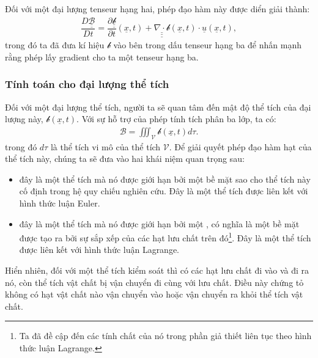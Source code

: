 \documentclass[../../../main.tex]{subfiles}
\begin{document}
		Đối với một đại lượng tenseur hạng hai, phép đạo hàm này được diển giải thành:
			\begin{align}
				\boxed{\dfrac{D\underline{\underline{\mathscr{B}}}}{Dt}=\dfrac{\partial\underline{\underline{\mathscr{b}}}}{\partial t}\left(\underline{x},t\right)+\underline{\underline{\underline{\nabla\cdot\mathscr{b}}}}\left(\underline{x},t\right)\cdot\underline{u}\left(\underline{x},t\right)},
			\end{align}
		trong đó ta đã đưa kí hiệu $\mathscr{b}$ vào bên trong dấu tenseur  hạng ba để nhấn mạnh rằng phép lấy gradient cho ta một tenseur hạng ba.
	\subsubsection{Tính toán cho đại lượng thể tích}
		Đối với một đại lượng thể tích, người ta sẽ quan tâm đến mật độ thể tích của đại lượng này, $\mathcal{b}\left(\underline{x},t\right)$. Với sự hỗ trợ của phép tính tích phân ba lớp, ta có:
			\begin{align}\label{eq:Quantite_Volumique_def}
				\mathscr{B}=\iiint_{\mathscr{V}}\mathcal{b}\left(\underline{x},t\right)d\tau.
			\end{align}
		trong đó $d\tau$ là thể tích vi mô của thể tích $\mathscr{V}$. Để giải quyết phép đạo hàm hạt của thể tích này, chúng ta sẽ đưa vào hai khái niệm quan trọng sau:
		\begin{itemize}
			\item {} đây là một thể tích mà nó được giới hạn bởi một bề mặt sao cho thể tích này cố định trong hệ quy chiếu nghiên cứu. Đây là một thể tích được liên kết với hình thức luận Euler.
			\item {} đây là một thể tích mà nó được giới hạn bởi một , có nghĩa là một bề mặt được tạo ra bởi sự sắp xếp của các hạt lưu chất trên đó\footnote{Ta đã đề cập đến các tính chất của nó trong phần giả thiết liên tục theo hình thức luận Lagrange.}. Đây là một thể tích được liên kết với hình thức luận Lagrange.
		\end{itemize}

		Hiển nhiên, đối với một thể tích kiểm soát thì có các hạt lưu chất đi vào và đi ra nó, còn thể tích vật chất bị vận chuyển đi cùng với lưu chất. Điều này chứng tỏ không có hạt vật chất nào vận chuyển vào hoặc vận chuyển ra khỏi thể tích vật chất.
		
\end{document}
